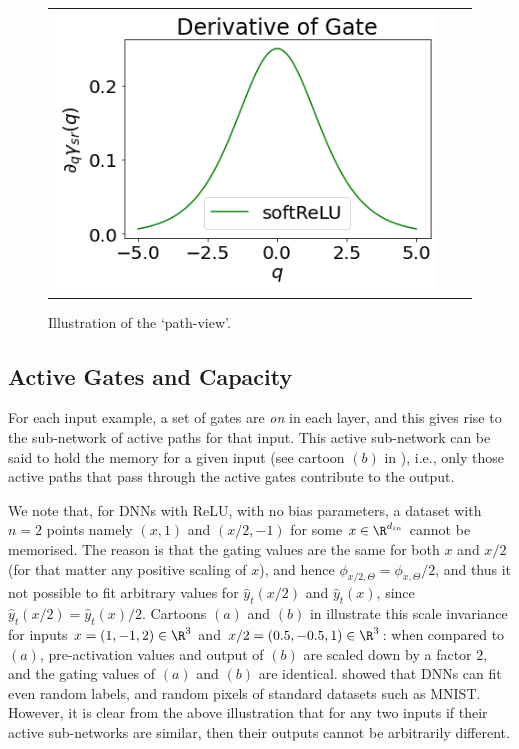 \begin{figure}[h]
{\begin{tabular}{ccc}
\includegraphics[scale=0.6]{figs/der-gate.png}
\end{tabular}
}
\caption{Illustration of the `path-view'.}
\label{fig:cartoon}
\end{figure}

\subsection{Active Gates and Capacity}
For each input example, a set of gates are \emph{on} in each layer, and this gives rise to the sub-network of active paths for that input. This active sub-network can be said to hold the memory for a given input (see cartoon $(b)$ in ), i.e., only those active paths that pass through the active gates contribute to the output. 

We note that, for DNNs with ReLU, with no bias parameters, a dataset with $n=2$ points namely $(x,1)$ and $(x/2,-1)$ for some $x\in \R^{d_{in}}$ cannot be memorised. The reason is that the gating values are the same for both $x$ and $x/2$ (for that matter any positive scaling of $x$), and hence $\phi_{x/2,\Theta}= \phi_{x,\Theta}/2$, and thus it not possible to fit arbitrary values for $\hat{y}_t(x/2)$ and $\hat{y}_t(x)$, since $\hat{y}_t(x/2)= \hat{y}_t(x)/2$. Cartoons $(a)$ and $(b)$ in  illustrate this scale invariance for inputs $x=(1,-1,2)\in\R^3$ and $x/2=(0.5,-0.5,1)\in\R^3$:  when compared to $(a)$, pre-activation values and output of $(b)$ are scaled down by a factor $2$, and the gating values of $(a)$ and $(b)$ are identical. \cite{ben} showed that DNNs can fit even random labels, and random pixels of standard datasets such as MNIST. However, it is clear from the above illustration that for any two inputs if their active sub-networks are similar, then their outputs cannot be arbitrarily different. 

